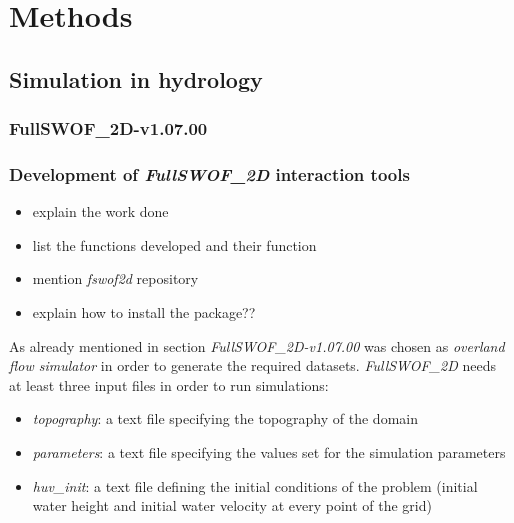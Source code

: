 \chapter{Methods}
\label{chp:methods}

\section{Simulation in hydrology}


\subsection{FullSWOF\_2D-v1.07.00}


\subsection{Development of \textit{FullSWOF\_2D} interaction tools}

\begin{itemize}
\itemsep0em
  \item explain the work done
  \item list the functions developed and their function
  \item mention \textit{fswof2d} repository
  \item explain how to install the package?? 
\end{itemize}

As already mentioned in section  \textit{FullSWOF\_2D-v1.07.00} was chosen as \emph{overland flow simulator} in order to generate the required datasets.
\textit{FullSWOF\_2D} needs at least three input files in order to run simulations:

\begin{itemize}
\itemsep0em
  \item \textit{topography}: a text file specifying the topography of the domain
  \item \textit{parameters}: a text file specifying the values set for the simulation parameters
  \item \textit{huv\_init}: a text file defining the initial conditions of the problem (initial water height and initial water velocity at every point of the grid)
\end{itemize}

